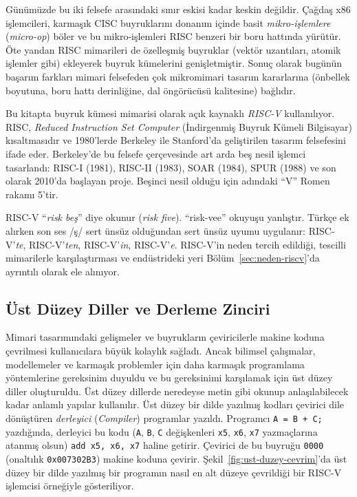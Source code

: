 Günümüzde bu iki felsefe arasındaki sınır eskisi kadar keskin değildir. Çağdaş x86 işlemcileri, karmaşık CISC buyruklarını donanım içinde basit \emph{mikro-işlemlere} (\emph{micro-op}) böler ve bu mikro-işlemleri RISC benzeri bir boru hattında yürütür. Öte yandan RISC mimarileri de özelleşmiş buyruklar (vektör uzantıları, atomik işlemler gibi) ekleyerek buyruk kümelerini genişletmiştir. Sonuç olarak bugünün başarım farkları mimari felsefeden çok mikromimari tasarım kararlarına (önbellek boyutuna, boru hattı derinliğine, dal öngörücüsü kalitesine) bağlıdır.

\begin{bilginot}
Bu kitapta buyruk kümesi mimarisi olarak açık kaynaklı \emph{RISC-V} kullanılıyor. RISC, \emph{Reduced Instruction Set Computer} (İndirgenmiş Buyruk Kümeli Bilgisayar) kısaltmasıdır ve 1980'lerde Berkeley ile Stanford'da geliştirilen tasarım felsefesini ifade eder. Berkeley'de bu felsefe çerçevesinde art arda beş nesil işlemci tasarlandı: RISC-I (1981), RISC-II (1983), SOAR (1984), SPUR (1988) ve son olarak 2010'da başlayan proje. Beşinci nesil olduğu için adındaki ``V'' Romen rakamı 5'tir.

RISC-V ``\emph{risk beş}'' diye okunur (\emph{risk five}). ``risk-vee'' okuyuşu yanlıştır. Türkçe ek alırken son ses /ş/ sert ünsüz olduğundan sert ünsüz uyumu uygulanır: RISC-V'\emph{te}, RISC-V'\emph{ten}, RISC-V'\emph{in}, RISC-V'\emph{e}. RISC-V'in neden tercih edildiği, tescilli mimarilerle karşılaştırması ve endüstrideki yeri Bölüm~\ref{sec:neden-riscv}'da ayrıntılı olarak ele alınıyor.
\end{bilginot}

\subsection{Üst Düzey Diller ve Derleme Zinciri}
\label{subsec:ust-duzey-diller}

Mimari tasarımındaki gelişmeler ve buyrukların çeviricilerle makine koduna çevrilmesi kullanıcılara büyük kolaylık sağladı. Ancak bilimsel çalışmalar, modellemeler ve karmaşık problemler için daha karmaşık programlama yöntemlerine gereksinim duyuldu ve bu gereksinimi karşılamak için üst düzey diller oluşturuldu. Üst düzey dillerde neredeyse metin gibi okunup anlaşılabilecek kadar anlamlı yapılar kullanılır. Üst düzey bir dilde yazılmış kodları çevirici dile dönüştüren \emph{derleyici} (\emph{Compiler}) programlar yazıldı. Programcı \texttt{A = B + C;} yazdığında, derleyici bu kodu (\texttt{A}, \texttt{B}, \texttt{C} değişkenleri \texttt{x5}, \texttt{x6}, \texttt{x7} yazmaçlarına atanmış olsun) \texttt{add x5, x6, x7} haline getirir. Çevirici de bu buyruğu \texttt{0000} (onaltılık \texttt{0x007302B3}) makine koduna çevirir. Şekil~\ref{fig:ust-duzey-cevrim}'da üst düzey bir dilde yazılmış bir programın nasıl en alt düzeye çevrildiği bir RISC-V işlemcisi örneğiyle gösteriliyor.


